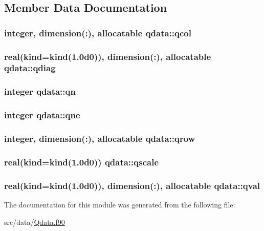\subsection{Member Data Documentation}
\hypertarget{classqdata_a5f6719033fda8397989e8d86c4947e53}{
\subsubsection[{qcol}]{\setlength{\rightskip}{0pt plus 5cm}integer, dimension(\-:), allocatable qdata\-::qcol}}\label{classqdata_a5f6719033fda8397989e8d86c4947e53}
\hypertarget{classqdata_a545fd0353e6bc1b8e0b8a615966a4971}{
\subsubsection[{qdiag}]{\setlength{\rightskip}{0pt plus 5cm}real(kind=kind(1.\-0d0)), dimension(\-:), allocatable qdata\-::qdiag}}\label{classqdata_a545fd0353e6bc1b8e0b8a615966a4971}
\hypertarget{classqdata_aa4944ce2e99ea3dcb54ea42d9b3f9a22}{
\subsubsection[{qn}]{\setlength{\rightskip}{0pt plus 5cm}integer qdata\-::qn}}\label{classqdata_aa4944ce2e99ea3dcb54ea42d9b3f9a22}
\hypertarget{classqdata_ad8959a634c2f41f8b347e089c6a69dae}{
\subsubsection[{qne}]{\setlength{\rightskip}{0pt plus 5cm}integer qdata\-::qne}}\label{classqdata_ad8959a634c2f41f8b347e089c6a69dae}
\hypertarget{classqdata_a2c604eee1d7b0a8fcd3a8e8432472b9e}{
\subsubsection[{qrow}]{\setlength{\rightskip}{0pt plus 5cm}integer, dimension(\-:), allocatable qdata\-::qrow}}\label{classqdata_a2c604eee1d7b0a8fcd3a8e8432472b9e}
\hypertarget{classqdata_a6495174880a8b3a90015032bfd4cfc9c}{
\subsubsection[{qscale}]{\setlength{\rightskip}{0pt plus 5cm}real(kind=kind(1.\-0d0)) qdata\-::qscale}}\label{classqdata_a6495174880a8b3a90015032bfd4cfc9c}
\hypertarget{classqdata_ae593212a134b4031c0919ae914716271}{
\subsubsection[{qval}]{\setlength{\rightskip}{0pt plus 5cm}real(kind=kind(1.\-0d0)), dimension(\-:), allocatable qdata\-::qval}}\label{classqdata_ae593212a134b4031c0919ae914716271}


The documentation for this module was generated from the following file\-:\begin{DoxyCompactItemize}
\item 
src/data/\hyperlink{_qdata_8f90}{Qdata.\-f90}\end{DoxyCompactItemize}
